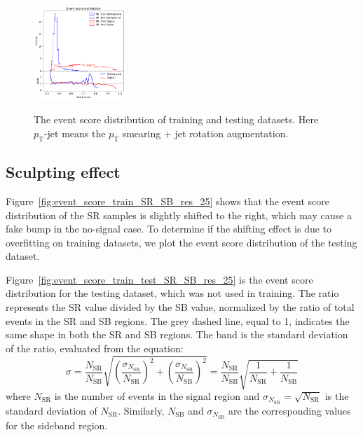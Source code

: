 \documentclass[12pt]{article}
\begin{document}
\begin{figure}[htpb]
{                \includegraphics[width=0.31\textwidth]{HVmodel_event_score_pt_jet_aug_3_train_test_SR_SB_7_res_25.pdf}
            } 
            \caption{The event score distribution of training and testing datasets. Here $p_{\text{T}}$-jet means the $p_{\text{T}}$ smearing + jet rotation augmentation.}
            \label{fig:event_score_train_test_SR_res_25}
        \end{figure}
    \subsection{Sculpting effect}%
    \label{sub:sculpting_effect_2}
        Figure~\ref{fig:event_score_train_SR_SB_res_25} shows that the event score distribution of the SR samples is slightly shifted to the right, which may cause a fake bump in the no-signal case. To determine if the shifting effect is due to overfitting on training datasets, we plot the event score distribution of the testing dataset. 

        Figure~\ref{fig:event_score_train_test_SR_SB_res_25} is the event score distribution for the testing dataset, which was not used in training. The ratio represents the SR value divided by the SB value, normalized by the ratio of total events in the SR and SB regions. The grey dashed line, equal to 1, indicates the same shape in both the SR and SB regions. The band is the standard deviation of the ratio, evaluated from the equation:
        \begin{equation}
            \sigma = \frac{N_{\text{SR}}}{N_{\text{SB}}} \sqrt{\left( \frac{\sigma_{N_{\text{SR}}}}{N_{\text{SR}}} \right)^2 + \left( \frac{\sigma_{N_{\text{SB}}}}{N_{\text{SB}}} \right)^2} = \frac{N_{\text{SR}}}{N_{\text{SB}}} \sqrt{ \frac{1}{N_{\text{SR}}} + \frac{1}{N_{\text{SB}}} }  
        \end{equation}
        where $N_{\text{SR}}$ is the number of events in the signal region and $\sigma_{N_{\text{SR}}} = \sqrt{N_{\text{SR}}}$ is the standard deviation of $N_{\text{SR}}$. Similarly, $N_{\text{SB}}$ and $\sigma_{N_{\text{SB}}}$ are the corresponding values for the sideband region.
\end{document}

